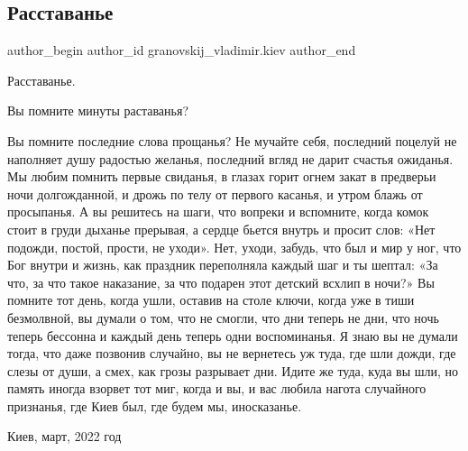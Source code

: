  
 
 
 
 
 
\subsection{Расставанье}
\label{sec:23_02_2022.fb.granovskij_vladimir.kiev.1.rasstavanie}
 
\ifcmt
 author_begin
   author_id granovskij_vladimir.kiev
 author_end
\fi

Расставанье.

Вы помните минуты раставанья? 


Вы помните последние слова прощанья?  Не мучайте себя, последний поцелуй не
наполняет душу радостью желанья, последний вгляд не дарит счастья ожиданья. Мы
любим помнить первые свиданья, в глазах горит огнем закат в предверьи ночи
долгожданной, и дрожь по телу от первого касанья, и утром блажь от просыпанья.
А вы решитесь на шаги, что вопреки и вспомните, когда комок стоит в груди
дыханье прерывая, а сердце бьется внутрь и просит слов: «Нет подожди, постой,
прости, не уходи». Нет, уходи, забудь, что был и мир у ног, что Бог внутри и
жизнь, как праздник переполняла каждый шаг и ты шептал: «За что, за что такое
наказание, за что подарен этот детский всхлип в ночи?» Вы помните тот день,
когда ушли, оставив на столе ключи, когда уже в тиши безмолвной, вы думали о
том, что не смогли, что дни теперь не дни, что ночь теперь бессонна и каждый
день теперь одни воспоминанья. Я знаю вы не думали тогда, что даже позвонив
случайно, вы не вернетесь уж туда, где шли дожди, где слезы от души, а смех,
как грозы разрывает дни. Идите же туда, куда вы шли, но память иногда взорвет
тот миг, когда и вы, и вас любила нагота случайного признанья, где Киев был,
где будем мы, иносказанье. 

Киев, март, 2022 год
